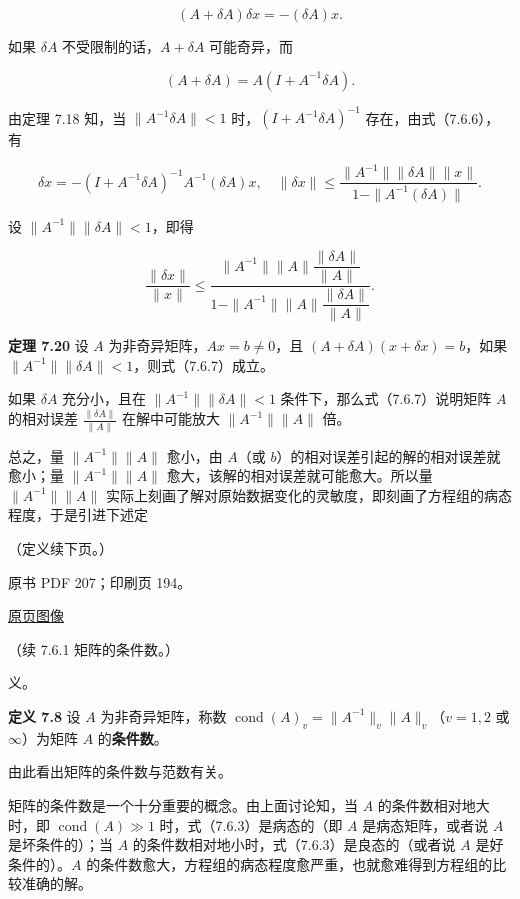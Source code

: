 \documentclass[
  10pt,
  fontset=fandol]{ctexart}
\begin{document}
\[
(A+\delta A)\delta x=-(\delta A)x.
\tag{7.6.6}
\]

如果 \(\delta A\) 不受限制的话，\(A+\delta A\) 可能奇异，而

\[
(A+\delta A)=A(I+A^{-1}\delta A).
\]

由定理 7.18 知，当 \(\|A^{-1}\delta A\|<1\)
时，\((I+A^{-1}\delta A)^{-1}\) 存在，由式（7.6.6），有

\[
\delta x=-(I+A^{-1}\delta A)^{-1}A^{-1}(\delta A)x,\quad
\|\delta x\|\leqslant\frac{\|A^{-1}\|\|\delta A\|\|x\|}{1-\|A^{-1}(\delta A)\|}.
\]

设 \(\|A^{-1}\|\|\delta A\|<1\)，即得

\[
\frac{\|\delta x\|}{\|x\|}
\leqslant
\frac{\|A^{-1}\|\|A\|\dfrac{\|\delta A\|}{\|A\|}}
{1-\|A^{-1}\|\|A\|\dfrac{\|\delta A\|}{\|A\|}}.
\tag{7.6.7}
\]

\textbf{定理 7.20} 设 \(A\) 为非奇异矩阵，\(Ax=b\neq0\)，且
\((A+\delta A)(x+\delta x)=b\)，如果
\(\|A^{-1}\|\|\delta A\|<1\)，则式（7.6.7）成立。

如果 \(\delta A\) 充分小，且在 \(\|A^{-1}\|\|\delta A\|<1\)
条件下，那么式（7.6.7）说明矩阵 \(A\) 的相对误差
\(\frac{\|\delta A\|}{\|A\|}\) 在解中可能放大 \(\|A^{-1}\|\|A\|\) 倍。

总之，量 \(\|A^{-1}\|\|A\|\) 愈小，由 \(A\)（或
\(b\)）的相对误差引起的解的相对误差就愈小；量 \(\|A^{-1}\|\|A\|\)
愈大，该解的相对误差就可能愈大。所以量 \(\|A^{-1}\|\|A\|\)
实际上刻画了解对原始数据变化的灵敏度，即刻画了方程组的病态程度，于是引进下述定

（定义续下页。）

\clearpage

原书 PDF 207；印刷页 194。

\href{/Users/xiangjunfeng/Desktop/数值计算专用/numerical-analysis/book/source-images/pdf-207.jpeg}{原页图像}

（续 7.6.1 矩阵的条件数。）

义。

\textbf{定义 7.8} 设 \(A\) 为非奇异矩阵，称数
\(\operatorname{cond}(A)_v=\|A^{-1}\|_v\|A\|_v\)（\(v=1,2\) 或
\(\infty\)）为矩阵 \(A\) 的\textbf{条件数}。

由此看出矩阵的条件数与范数有关。

矩阵的条件数是一个十分重要的概念。由上面讨论知，当 \(A\)
的条件数相对地大时，即 \(\operatorname{cond}(A)\gg1\)
时，式（7.6.3）是病态的（即 \(A\) 是病态矩阵，或者说 \(A\)
是坏条件的）；当 \(A\) 的条件数相对地小时，式（7.6.3）是良态的（或者说
\(A\) 是好条件的）。\(A\)
的条件数愈大，方程组的病态程度愈严重，也就愈难得到方程组的比较准确的解。
\end{document}
